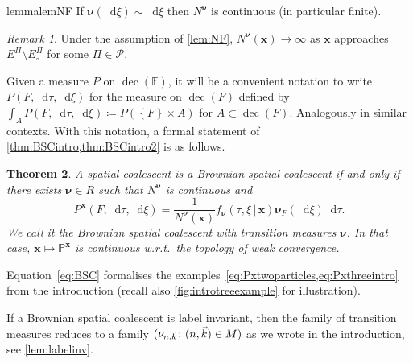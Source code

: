 \documentclass[reqno,draft]{amsart}
\numberwithin{equation}{section}
\theoremstyle{plain}
\newtheorem{theorem}{Theorem}[section]
\newtheorem{lemma}[theorem]{Lemma}
\theoremstyle{remark}
\newtheorem{remark}[theorem]{Remark}
\renewcommand{\P}{\mathbb{P}} %
\newcommand*\diff{\mathop{}\!\mathrm{d}}
\newcommand{\fpart}{\Pi} %
\newcommand{\nurates}{R} %
\newcommand{\mergers}{M}
\DeclareMathOperator{\dcb}{dec}
\newcommand{\fnu}{f_{\boldsymbol \nu}}
\newcommand{\nunk}{\nu_{n,\smash{\vec{k}}}}
\begin{document}
\begin{restatable}{lemma}{lemNF}\label{lem:NF}
    If $\boldsymbol \nu(\diff \xi) \sim \diff \xi$ then $N^{\boldsymbol \nu}$ is continuous (in particular finite).
\end{restatable}

\begin{remark}\label{rem:Ndivergence}
    Under the assumption of \cref{lem:NF}, $N^{\boldsymbol \nu}(\boldsymbol x) \to \infty$ as $\boldsymbol x$ approaches $E^\fpart \setminus E^\fpart_\circ $ for some $\fpart\in \mathcal{P}$. %
\end{remark}

Given a measure $P$ on $\dcb(\mathbb{F})$, it will be a convenient notation to write $P(F,\diff \tau,\diff \xi)$ for the measure on $\dcb(F)$ defined by $\int_A P(F,\diff \tau,\diff \xi) \coloneqq P(\left\{ F \right\} \times A)$ for $A \subset \dcb(F)$. Analogously in similar contexts. With this notation, a formal statement of \cref{thm:BSCintro,thm:BSCintro2} is as follows.

\begin{theorem}\label{thm:BSC}
    A spatial coalescent is a Brownian spatial coalescent if and only if there exists $\boldsymbol \nu\in \nurates$ such that $N^{\boldsymbol \nu}$ is continuous and
    \begin{equation}\label{eq:BSC}
        P^{\boldsymbol x}(F,\diff \tau,\diff \xi) = \frac{1}{N^{\boldsymbol \nu}(\boldsymbol x)} \fnu(\tau,\xi \,\vert\,\boldsymbol x) \boldsymbol \nu_F(\diff \xi) \diff \tau.
    \end{equation}
    We call it the \emph{Brownian spatial coalescent with transition measures $\boldsymbol \nu$}. In that case, $\boldsymbol x \mapsto \P^{\boldsymbol x}$ is continuous w.r.t.\ the topology of weak convergence.
\end{theorem}

Equation~\eqref{eq:BSC} formalises the examples~\cref{eq:Pxtwoparticles,eq:Pxthreeintro} from the introduction (recall also \cref{fig:introtreeexample} for illustration).

If a Brownian spatial coalescent is label invariant, then the family of transition measures reduces to a family $(\nunk \colon (n,\vec{k}) \in \mergers)$ as we wrote in the introduction, see \cref{lem:labelinv}.
\end{document}
